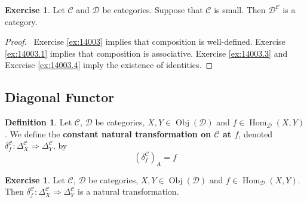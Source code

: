 \documentclass{book}
\theoremstyle{definition}
\newtheorem{defn}[definition]{Definition}
\newtheorem{ex}[definition]{Exercise}
\newcommand{\del}{\delta}
\newcommand{\Del}{\Delta}
\newcommand{\MC}{\mathcal{C}}
\newcommand{\MD}{\mathcal{D}}
\newcommand{\lex}[1]{\label{ex:#1}}
\newcommand{\rex}[1]{Exercise \ref{ex:#1}}
\newcommand{\ld}[1]{\label{defn:#1}}
\DeclareMathOperator{\Obj}{Obj}
\DeclareMathOperator{\Hom}{Hom}
\DeclareMathOperator*{\0}{\mbf{0}}
\DeclareMathOperator*{\1}{\mbf{1}}
\begin{document}
	\begin{ex} \lex{14007}
		Let $\MC$ and $\MD$ be categories. Suppose that $\MC$ is small. Then $\MD^{\MC}$ is a category.
	\end{ex}

	\begin{proof}\
		\rex{14003} implies that composition is well-defined. \rex{14003.1} implies that composition is associative. \rex{14003.3} and \rex{14003.4} imply the existence of identities.  
	\end{proof}


	
	
	
	
	
	
	
	\subsection{Diagonal Functor}

	\begin{defn} \ld{14008}
		Let $\MC$, $\MD$ be categories, $X, Y \in \Obj(\MD)$ and $f \in \Hom_{\MD}(X, Y)$. We define the \textbf{constant natural transformation on $\MC$ at $f$}, denoted $\del^{\MC}_f: \Del^{\MC}_X \Rightarrow \Del^{\MC}_Y$, by
		$$(\del^{\MC}_f)_A = f$$
	\end{defn}
	
	\begin{ex} \lex{14009}
		Let $\MC$, $\MD$ be categories, $X, Y \in \Obj(\MD)$ and $f \in \Hom_{\MD}(X, Y)$. Then $\del^{\MC}_f: \Del^{\MC}_X \Rightarrow \Del^{\MC}_Y $ is a natural transformation.
	\end{ex}
	
\end{document}
